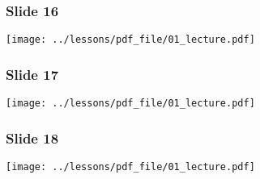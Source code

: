 \documentclass[../main/main.tex]{subfiles}
\begin{document}
\subsubsection*{Slide 16}

\begin{minipage}[]{0.5\linewidth}
\centering
\texttt{[image: ../lessons/pdf\_file/01\_lecture.pdf]}
\end{minipage}
\hspace{0.3cm}\vspace{0.3cm}
\begin{minipage}[c]{0.47\linewidth}

\end{minipage}

\subsubsection*{Slide 17}

\begin{minipage}[]{0.5\linewidth}
\centering
\texttt{[image: ../lessons/pdf\_file/01\_lecture.pdf]}
\end{minipage}
\hspace{0.3cm}\vspace{0.3cm}
\begin{minipage}[c]{0.47\linewidth}

\end{minipage}

\subsubsection*{Slide 18}

\begin{minipage}[]{0.5\linewidth}
\centering
\texttt{[image: ../lessons/pdf\_file/01\_lecture.pdf]}
\end{minipage}
\hspace{0.3cm}\vspace{0.3cm}
\begin{minipage}[c]{0.47\linewidth}

\end{minipage}
\end{document}
